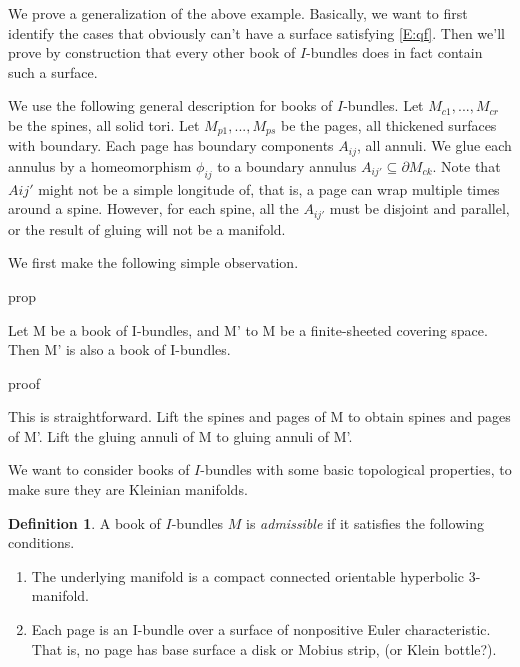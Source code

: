 \documentclass[12pt]{amsart}
\theoremstyle{definition}
\newtheorem{defn}[theorem]{Definition}
\theoremstyle{remark}
\newcommand{\bd}{\partial}
\newcommand{\cin}{\subseteq}
\begin{document}
We prove a generalization of the above example. Basically, we want to first
identify the cases that obviously can't have a surface satisfying \eqref{E:qf}.
Then we'll prove by construction that every other book of $I$-bundles does in
fact contain such a surface.

We use the following general description for books of $I$-bundles. Let
$M_{c1},...,M_{cr}$ be the spines, all solid tori. Let $M_{p1},...,M_{ps}$ be
the pages, all thickened surfaces with boundary. Each page has boundary
components $A_{ij}$, all annuli. We glue each annulus by a homeomorphism
$\phi_{ij}$ to a boundary annulus $A_{ij'}\cin \bd M_{ck}$. Note that $Aij'$
might not be a simple longitude of, that is, a page can wrap multiple times
around a spine.  However, for each spine, all the $A_{ij'}$ must be disjoint
and parallel, or the result of gluing will not be a manifold.

We first make the following simple observation.

prop

Let M be a book of I-bundles, and M' to M be a finite-sheeted covering space.
Then M' is also a book of I-bundles.

proof

This is straightforward. Lift the spines and pages of M to obtain spines and
pages of M'. Lift the gluing annuli of M to gluing annuli of M'.

We want to consider books of $I$-bundles with some basic topological
properties, to make sure they are Kleinian manifolds.

\begin{defn}

A book of $I$-bundles $M$ is \emph{admissible} if it satisfies the following
conditions.

\begin{enumerate}

\item The underlying manifold is a compact connected orientable hyperbolic
3-manifold.

\item Each page is an I-bundle over a surface of nonpositive Euler
characteristic. That is, no page has base surface a disk or Mobius strip, (or
Klein bottle?).


\end{enumerate}

\end{defn}
\end{document}
